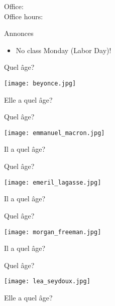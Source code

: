 \documentclass{beamer}
\subtitle[Nombres et adjectifs]{Les nombres et les adjectifs}
\begin{document}
  \begin{frame}
    \titlepage
    \tiny{Office: \\
          Office hours: }
  \end{frame}

  \begin{frame}{Annonces}
    \begin{itemize}
      \item No class Monday (Labor Day)!
    \end{itemize}
  \end{frame}

  \begin{frame}{Quel âge?}
    \begin{center}
      \texttt{[image: beyonce.jpg]}

      Elle a quel âge? \underline{}
    \end{center}
  \end{frame}

  \begin{frame}{Quel âge?}
    \begin{center}
      \texttt{[image: emmanuel\_macron.jpg]}

      Il a quel âge? \underline{}
    \end{center}
  \end{frame}

  \begin{frame}{Quel âge?}
    \begin{center}
      \texttt{[image: emeril\_lagasse.jpg]}

      Il a quel âge? \underline{}
    \end{center}
  \end{frame}

  \begin{frame}{Quel âge?}
    \begin{center}
      \texttt{[image: morgan\_freeman.jpg]}

      Il a quel âge? \underline{}
    \end{center}
  \end{frame}

  \begin{frame}{Quel âge?}
    \begin{center}
      \texttt{[image: lea\_seydoux.jpg]}

      Elle a quel âge? \underline{}
    \end{center}
  \end{frame}
\end{document}
